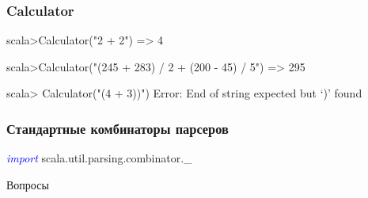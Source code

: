 \documentclass{beamer}
\newcommand{\keyword}[1]{\textcolor{blue}{\textsl{#1}}}
\begin{document}
\begin{frame}[fragile]
  \frametitle{Calculator}
  \begin{semiverbatim}
scala>\pause Calculator("2 + 2")\pause
=> 4

scala>\pause Calculator("(245 + 283) / 2 + (200 - 45) / 5")\pause
=> 295

scala> \pause{}Calculator("(4 + 3))")\pause
Error: End of string expected but `)' found
  \end{semiverbatim}
\end{frame}

\begin{frame}[fragile]
  \frametitle{Стандартные комбинаторы парсеров}
  \Large
  \begin{semiverbatim}
\keyword{import} scala.util.parsing.combinator._
  \end{semiverbatim}
\end{frame}

\begin{frame}
  \begin{center}
    \Huge Вопросы
  \end{center}
\end{frame}
\end{document}
